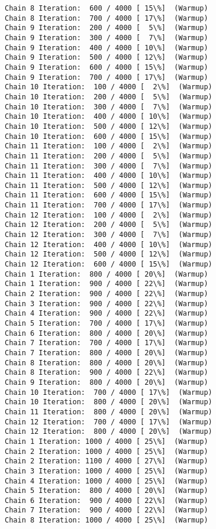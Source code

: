 \documentclass[11pt]{article}
\begin{document}
\begin{Verbatim}[commandchars=\\\{\}]
Chain 8 Iteration:  600 / 4000 [ 15\%]  (Warmup)
Chain 8 Iteration:  700 / 4000 [ 17\%]  (Warmup)
Chain 9 Iteration:  200 / 4000 [  5\%]  (Warmup)
Chain 9 Iteration:  300 / 4000 [  7\%]  (Warmup)
Chain 9 Iteration:  400 / 4000 [ 10\%]  (Warmup)
Chain 9 Iteration:  500 / 4000 [ 12\%]  (Warmup)
Chain 9 Iteration:  600 / 4000 [ 15\%]  (Warmup)
Chain 9 Iteration:  700 / 4000 [ 17\%]  (Warmup)
Chain 10 Iteration:  100 / 4000 [  2\%]  (Warmup)
Chain 10 Iteration:  200 / 4000 [  5\%]  (Warmup)
Chain 10 Iteration:  300 / 4000 [  7\%]  (Warmup)
Chain 10 Iteration:  400 / 4000 [ 10\%]  (Warmup)
Chain 10 Iteration:  500 / 4000 [ 12\%]  (Warmup)
Chain 10 Iteration:  600 / 4000 [ 15\%]  (Warmup)
Chain 11 Iteration:  100 / 4000 [  2\%]  (Warmup)
Chain 11 Iteration:  200 / 4000 [  5\%]  (Warmup)
Chain 11 Iteration:  300 / 4000 [  7\%]  (Warmup)
Chain 11 Iteration:  400 / 4000 [ 10\%]  (Warmup)
Chain 11 Iteration:  500 / 4000 [ 12\%]  (Warmup)
Chain 11 Iteration:  600 / 4000 [ 15\%]  (Warmup)
Chain 11 Iteration:  700 / 4000 [ 17\%]  (Warmup)
Chain 12 Iteration:  100 / 4000 [  2\%]  (Warmup)
Chain 12 Iteration:  200 / 4000 [  5\%]  (Warmup)
Chain 12 Iteration:  300 / 4000 [  7\%]  (Warmup)
Chain 12 Iteration:  400 / 4000 [ 10\%]  (Warmup)
Chain 12 Iteration:  500 / 4000 [ 12\%]  (Warmup)
Chain 12 Iteration:  600 / 4000 [ 15\%]  (Warmup)
Chain 1 Iteration:  800 / 4000 [ 20\%]  (Warmup)
Chain 1 Iteration:  900 / 4000 [ 22\%]  (Warmup)
Chain 2 Iteration:  900 / 4000 [ 22\%]  (Warmup)
Chain 3 Iteration:  900 / 4000 [ 22\%]  (Warmup)
Chain 4 Iteration:  900 / 4000 [ 22\%]  (Warmup)
Chain 5 Iteration:  700 / 4000 [ 17\%]  (Warmup)
Chain 6 Iteration:  800 / 4000 [ 20\%]  (Warmup)
Chain 7 Iteration:  700 / 4000 [ 17\%]  (Warmup)
Chain 7 Iteration:  800 / 4000 [ 20\%]  (Warmup)
Chain 8 Iteration:  800 / 4000 [ 20\%]  (Warmup)
Chain 8 Iteration:  900 / 4000 [ 22\%]  (Warmup)
Chain 9 Iteration:  800 / 4000 [ 20\%]  (Warmup)
Chain 10 Iteration:  700 / 4000 [ 17\%]  (Warmup)
Chain 10 Iteration:  800 / 4000 [ 20\%]  (Warmup)
Chain 11 Iteration:  800 / 4000 [ 20\%]  (Warmup)
Chain 12 Iteration:  700 / 4000 [ 17\%]  (Warmup)
Chain 12 Iteration:  800 / 4000 [ 20\%]  (Warmup)
Chain 1 Iteration: 1000 / 4000 [ 25\%]  (Warmup)
Chain 2 Iteration: 1000 / 4000 [ 25\%]  (Warmup)
Chain 2 Iteration: 1100 / 4000 [ 27\%]  (Warmup)
Chain 3 Iteration: 1000 / 4000 [ 25\%]  (Warmup)
Chain 4 Iteration: 1000 / 4000 [ 25\%]  (Warmup)
Chain 5 Iteration:  800 / 4000 [ 20\%]  (Warmup)
Chain 6 Iteration:  900 / 4000 [ 22\%]  (Warmup)
Chain 7 Iteration:  900 / 4000 [ 22\%]  (Warmup)
Chain 8 Iteration: 1000 / 4000 [ 25\%]  (Warmup)

\end{Verbatim}
\end{document}
